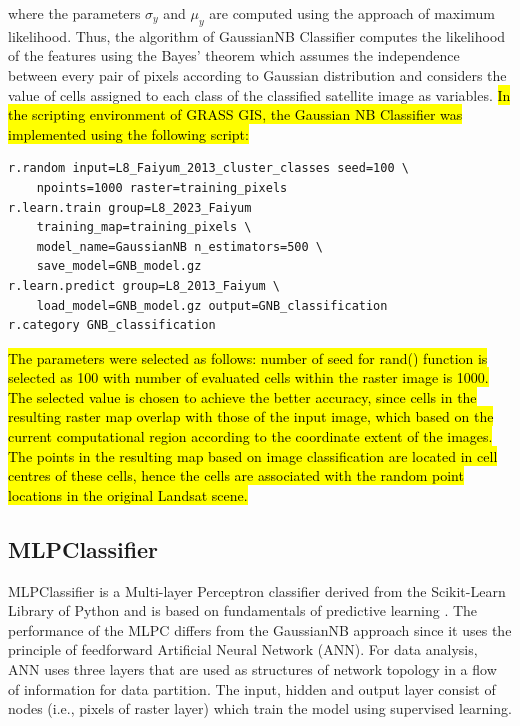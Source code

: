 \documentclass[final,5p,times,twocolumn]{elsarticle}
\begin{document}
where the parameters $\sigma_y$ and $\mu_y$  are computed using the approach of maximum likelihood. Thus, the algorithm of GaussianNB Classifier computes the likelihood of the features using the Bayes' theorem which assumes the independence between every pair of pixels according to Gaussian distribution and considers the value of cells assigned to each class of the classified satellite image as variables. \hl{In the scripting environment of GRASS GIS, the Gaussian NB Classifier was implemented using the following script: }

\begin{footnotesize}
\begin{verbatim}
r.random input=L8_Faiyum_2013_cluster_classes seed=100 \
    npoints=1000 raster=training_pixels
r.learn.train group=L8_2023_Faiyum 
    training_map=training_pixels \
    model_name=GaussianNB n_estimators=500 \
    save_model=GNB_model.gz
r.learn.predict group=L8_2013_Faiyum \
    load_model=GNB_model.gz output=GNB_classification
r.category GNB_classification
\end{verbatim}
\end{footnotesize}

\hl{The parameters were selected as follows: number of seed for rand() function is selected as 100 with number of evaluated cells within the raster image is 1000. The selected value is chosen to achieve the better accuracy, since cells in the resulting raster map overlap with those of the input image, which based on the current computational region according to the coordinate extent of the images. The points in the resulting map based on image classification are located in cell centres of these cells, hence the cells are associated with the random point locations in the original Landsat scene. }

\subsection{MLPClassifier}

MLPClassifier is a Multi-layer Perceptron classifier derived from the Scikit-Learn Library of Python and is based on fundamentals of predictive learning \cite{Rosenblatt}. The performance of the MLPC differs from the GaussianNB approach since it uses the principle of feedforward Artificial Neural Network (ANN). For data analysis, ANN uses three layers that are used as structures of network topology in a flow of information for data partition. The input, hidden and output layer consist of nodes (i.e., pixels of raster layer) which train the model using supervised learning. 
\end{document}
